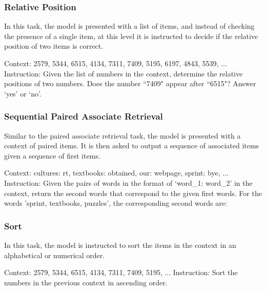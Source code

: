 \subsubsection{Relative Position}

In this task, the model is presented with a list of items, and instead of checking the presence of a single item, at this level it is instructed to decide if the relative position of two items is correct.

\begin{tcolorbox}[colback=red!5!white,colframe=red!75!black,title=Example prompt]
Context: 2579, 5344, 6515, 4134, 7311, 7409, 5195, 6197, 4843, 5539, ...
\tcblower
Instruction: Given the list of numbers in the context, determine the relative positions of two numbers. Does the number ``7409" appear after ``6515"? Answer `yes' or `no'.
\end{tcolorbox}

\subsubsection{Sequential Paired Associate Retrieval}

Similar to the paired associate retrieval task, the model is presented with a context of paired items. It is then asked to output a sequence of associated items given a sequence of first items.

\begin{tcolorbox}[colback=red!5!white,colframe=red!75!black,title=Example prompt]
Context: cultures: rt, textbooks: obtained, our: webpage, sprint: bye, ...
\tcblower
Instruction: Given the pairs of words in the format of `word\_1: word\_2' in the context, return the second words that correspond to the given first words. For the words 'sprint, textbooks, puzzles', the corresponding second words are:\end{tcolorbox}

\subsubsection{Sort}
In this task, the model is instructed to sort the items in the context in an alphabetical or numerical order.

\begin{tcolorbox}[colback=red!5!white,colframe=red!75!black,title=Example prompt]
Context: 2579, 5344, 6515, 4134, 7311, 7409, 5195, ...
\tcblower
Instruction: Sort the numbers in the previous context in ascending order.\end{tcolorbox}

